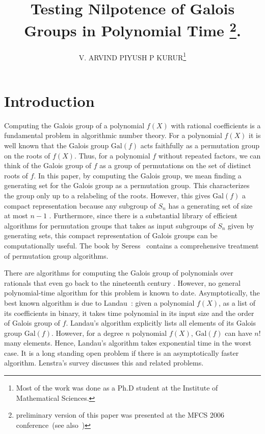\documentclass[prodmod,acmtalg]{acmsmall}
\title{Testing Nilpotence of Galois Groups in Polynomial Time
\footnote{preliminary version of this paper was presented at the MFCS
  2006 conference~\cite{AK2006}(see also~\cite{K2006})}.}
\author{V. ARVIND
  \affil{Institute of Mathematical Sciences,\\
    CIT Campus, Chennai, India 600113.\\
    {\tt arvind@imsc.res.in}.
  }
  PIYUSH P KURUR\footnote{Most of the work was done as a Ph.D student at the
    Institute of Mathematical Sciences.}
  \affil{Department of Computer Science and Engineering,\\
    Indian Institute of Technology, Kanpur,\\
    Kanpur, UP 208016, India.\\
    {\tt ppk@cse.iitk.ac.in}
  }
}
\newcommand{\Gal}[1]{{\ensuremath{\mathrm{Gal}\left(#1\right)}}}
\begin{document}
\maketitle


\section{Introduction}

Computing the Galois group of a polynomial $f(X)$ with rational
coefficients is a fundamental problem in algorithmic number
theory. For a polynomial $f(X)$ it is well known that the Galois group
$\Gal{f}$ acts faithfully as a permutation group on the roots of
$f(X)$. Thus, for a polynomial $f$ without repeated factors, we can
think of the Galois group of $f$ as a group of permutations on the set
of distinct roots of $f$. In this paper, by computing the Galois
group, we mean finding a generating set for the Galois group as a
permutation group. This characterizes the group only up to a
relabeling of the roots. However, this gives $\Gal{f}$ a compact
representation because any subgroup of $S_n$ has a generating set of
size at most $n-1$ \cite{Jerrum1986}. Furthermore, since there is a
substantial library of efficient algorithms for permutation groups
that takes as input subgroups of $S_n$ given by generating sets, this
compact representation of Galois groups can be computationally
useful. The book by Seress~\cite{seress2003permutationalgo} contains a
comprehensive treatment of permutation group algorithms.

There are algorithms for computing the Galois group of polynomials
over rationals that even go back to the nineteenth century
\cite{TS50}. However, no general polynomial-time algorithm for this
problem is known to date. Asymptotically, the best known algorithm is
due to Landau~\cite{landau84galois}: given a polynomial $f(X)$, as a
list of its coefficients in binary, it takes time polynomial in its
input size and the order of Galois group of $f$. Landau's algorithm
explicitly lists all elements of its Galois group $\Gal{f}$. However,
for a degree $n$ polynomial $f(X)$, $\Gal{f}$ can have $n!$ many
elements. Hence, Landau's algorithm takes exponential time in the
worst case. It is a long standing open problem if there is an
asymptotically faster algorithm. Lenstra's survey
\cite{lenstra92algorithm} discusses this and related problems.
\end{document}
